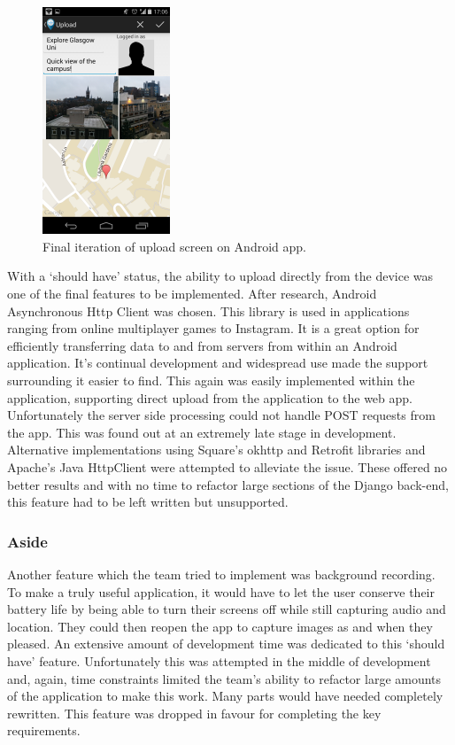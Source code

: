 \documentclass{l3proj}
\begin{document}
\begin{figure}[ht!]
\centering
\includegraphics[width=0.34\textwidth]{images/final-upload-screen.png}
\caption{Final iteration of upload screen on Android app.}
\end{figure}

With a ‘should have’ status, the ability to upload directly from the device was one of the final features to be implemented. After research, Android Asynchronous Http Client\cite{androidasync} was chosen. This library is used in applications ranging from online multiplayer games to Instagram. It is a great option for efficiently transferring data to and from servers from within an Android application. It's continual development and widespread use made the support surrounding it easier to find. This again was easily implemented within the application, supporting direct upload from the application to the web app. Unfortunately the server side processing could not handle POST requests from the app. This was found out at an extremely late stage in development. Alternative implementations using Square's okhttp\cite{okhttp} and Retrofit\cite{retrofit} libraries and Apache’s Java HttpClient were attempted to alleviate the issue. These offered no better results and with no time to refactor large sections of the \gls{Django} back-end, this feature had to be left written but unsupported.

\subsubsection{Aside}
Another feature which the team tried to implement was background recording. To make a truly useful application, it would have to let the user conserve their battery life by being able to turn their screens off while still capturing audio and location. They could then reopen the app to capture images as and when they pleased. An extensive amount of development time was dedicated to this ‘should have’ feature. Unfortunately this was attempted in the middle of development and, again, time constraints limited the team's ability to refactor large amounts of the application to make this work. Many parts would have needed completely rewritten. This feature was dropped in favour for completing the key requirements.
\end{document}
